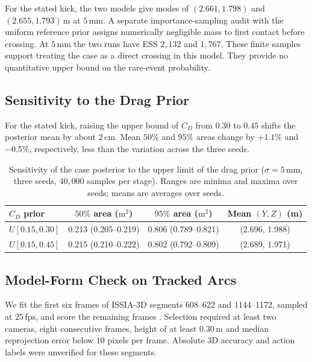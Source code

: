 \documentclass[11pt,a4paper]{article}
\begin{document}
For the stated kick, the two models give modes of $(2.661,1.798)$ and $(2.655,1.793)\,\mathrm{m}$ at $5\,\mathrm{mm}$. A separate importance-sampling audit with the uniform reference prior assigns numerically negligible mass to first contact before crossing. At $5\,\mathrm{mm}$ the two runs have ESS $2{,}132$ and $1{,}767$. These finite samples support treating the case as a direct crossing in this model. They provide no quantitative upper bound on the rare-event probability.

\subsection{Sensitivity to the Drag Prior}

For the stated kick, raising the upper bound of $C_D$ from $0.30$ to $0.45$ shifts the posterior mean by about $2\,\mathrm{cm}$. Mean $50\%$ and $95\%$ areas change by $+1.1\%$ and $-0.5\%$, respectively, less than the variation across the three seeds.

\begin{table}[htbp]
  \centering
  \caption{Sensitivity of the case posterior to the upper limit of the drag prior ($\sigma=5\,\mathrm{mm}$, three seeds, $40{,}000$ samples per stage). Ranges are minima and maxima over seeds; means are averages over seeds.}
  \label{tab:cdprior}
  \begin{tabular}{lccc}
    \toprule
    $C_D$ prior & $50\%$ area ($\mathrm{m^2}$) & $95\%$ area ($\mathrm{m^2}$) & Mean $(Y,Z)$ (m) \\
    \midrule
    $U[0.15,0.30]$ & 0.213 (0.205--0.219) & 0.806 (0.789--0.821) & (2.696, 1.988) \\
    $U[0.15,0.45]$ & 0.215 (0.210--0.222) & 0.802 (0.792--0.809) & (2.689, 1.971) \\
    \bottomrule
  \end{tabular}
\end{table}


\subsection{Model-Form Check on Tracked Arcs}
\label{sec:issia}

We fit the first six frames of ISSIA-3D segments 608--622 and 1144--1172, sampled at $25\,\mathrm{fps}$, and score the remaining frames \cite{soccernetv3d,issia}. Selection required at least two cameras, eight consecutive frames, height of at least $0.30\,\mathrm{m}$ and median reprojection error below $10$ pixels per frame. Absolute 3D accuracy and action labels were unverified for these segments.
\end{document}
